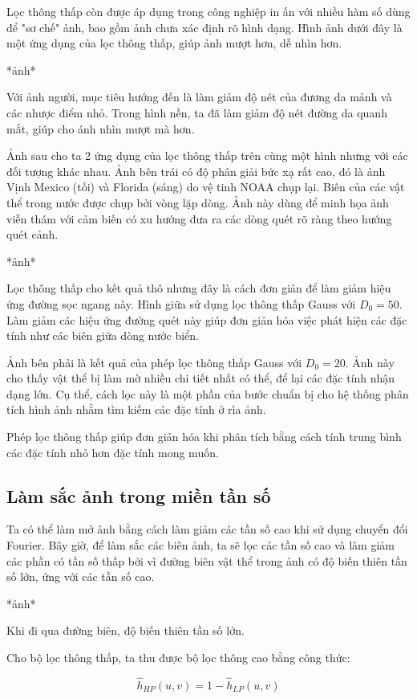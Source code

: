 \documentclass[12pt,a4paper]{report}
\numberwithin{equation}{section}
\theoremstyle{definition} %
\begin{document}
Lọc thông thấp còn được áp dụng trong công nghiệp in ấn với nhiều hàm số dùng để "sơ chế" ảnh, bao gồm ảnh chưa xác định rõ hình dạng. Hình ảnh dưới đây là một ứng dụng của lọc thông thấp, giúp ảnh mượt hơn, dễ nhìn hơn.

*ảnh*

Với ảnh người, mục tiêu hướng đến là làm giảm độ nét của đương da mảnh và các nhược điểm nhỏ. Trong hình nền, ta đã làm giảm độ nét đường da quanh mắt, giúp cho ánh nhìn mượt mà hơn.

Ảnh sau cho ta 2 ứng dụng của lọc thông thấp trên cùng một hình nhưng với các đối tượng khác nhau. Ảnh bên trái có độ phân giải bức xạ rất cao, đó là ảnh Vịnh Mexico (tối) và Florida (sáng) do vệ tinh NOAA chụp lại. Biên của các vật thể trong nước được chụp bởi vòng lặp dòng. Ảnh này dùng để minh họa ảnh viễn thám với cảm biến có xu hướng đưa ra các dòng quét rõ ràng theo hướng quét cảnh.

*ảnh*

Lọc thông thấp cho kết quả thô nhưng đây là cách đơn giản để làm giảm hiệu ứng đường sọc ngang này. Hình giữa sử dụng lọc thông thấp Gauss với $D_0=50$. Làm giảm các hiệu ứng đường quét này giúp đơn giản hóa việc phát hiện các đặc tính như các biên giữa dòng nước biển.

Ảnh bên phải là kết quả của phép lọc thông thấp Gauss với $D_0=20$. Ảnh này cho thấy vật thể bị làm mờ nhiều chi tiết nhất có thể, để lại các đặc tính nhận dạng lớn. Cụ thể, cách lọc này là một phần của bước chuẩn bị cho hệ thống phân tích hình ảnh nhằm tìm kiếm các đặc tính ở rìa ảnh.

Phép lọc thông thấp giúp đơn giản hóa khi phân tích bằng cách tính trung bình các đặc tính nhỏ hơn đặc tính mong muốn.
\subsection{Làm sắc ảnh trong miền tần số}

Ta có thể làm mở ảnh bằng cách làm giảm các tần số cao khi sử dụng chuyển đổi Fourier. Bây giờ, để làm sắc các biên ảnh, ta sẽ lọc các tần số cao và làm giảm các phần có tần số thấp bởi vì đường biên vật thể trong ảnh có độ biến thiên tần số lớn, ứng với các tần số cao.

*ảnh*

Khi đi qua đường biên, độ biến thiên tần số lớn.

Cho bộ lọc thông thấp, ta thu được bộ lọc thông cao bằng công thức:

\begin{equation}
    \hat{h}_{HP}(u,v) = 1 - \hat{h}_{LP}(u,v)
\end{equation}
\end{document}
